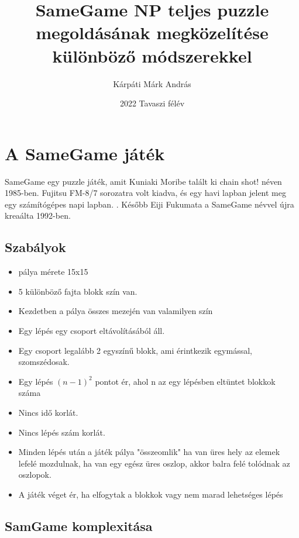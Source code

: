 \documentclass{article}
\title{SameGame NP teljes puzzle megoldásának megközelítése különböző módszerekkel}
\author{Kárpáti Márk András}
\date{2022 Tavaszi félév}
\begin{document}
	
	\maketitle
	
	
	\section{A SameGame játék}
	
	SameGame egy puzzle játék, amit Kuniaki Moribe talált ki chain shot! néven 1985-ben. Fujitsu FM-8/7 sorozatra volt kiadva, és egy havi lapban jelent meg egy számítógépes napi lapban. \cite{ChainShot1985}. Később Eiji Fukumata a SameGame névvel újra kreaálta 1992-ben.
	
	\subsection{Szabályok}
	
	\begin{itemize}		
		\item pálya mérete 15x15
		\item 5 különböző fajta blokk szín van.
		\item Kezdetben a pálya összes mezején van valamilyen szín
		\item Egy lépés egy csoport eltávolításából áll.
		\item Egy csoport legalább 2 egyszínű blokk, ami érintkezik egymással, szomszédosak.
		\item Egy lépés $ (n-1)^2 $ pontot ér, ahol n az egy lépésben eltüntet blokkok száma
		\item Nincs idő korlát.
		\item Nincs lépés szám korlát.
		\item Minden lépés után a játék pálya "összeomlik" ha van üres hely az elemek lefelé mozdulnak, ha van egy egész üres oszlop, akkor balra felé tolódnak az oszlopok.
		\item A játék véget ér, ha elfogytak a blokkok vagy nem marad lehetséges lépés
		
	\end{itemize}
	
	\subsection{SamGame komplexitása}
	
\end{document}
